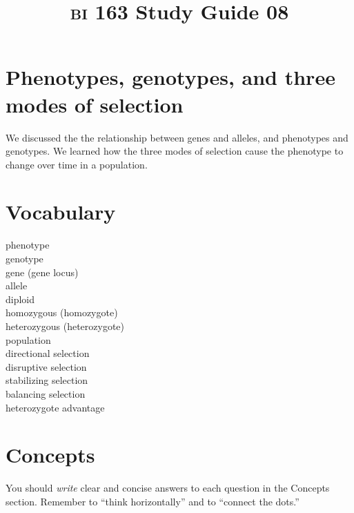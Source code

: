 \documentclass[letterpaper]{tufte-handout}
\title{{\scshape bi} 163 Study Guide 08}
\date{} %
\begin{document}
\maketitle	%

\section*{Phenotypes, genotypes, and three modes of selection}

We discussed the the relationship between genes and alleles, and phenotypes and genotypes. We learned how the three modes of selection cause the phenotype to change over time in a population.

\section*{Vocabulary}

\vspace{-1\baselineskip}
\begin{multicols}{2}
phenotype \\
genotype \\
gene (gene locus)\\
allele\\
diploid\\
homozygous (homozygote)\\
heterozygous (heterozygote)\\
population\\
directional selection\\
disruptive selection\\
stabilizing selection\\
balancing selection\\
heterozygote advantage

\end{multicols}

\section*{Concepts}

You should \emph{write} clear and concise answers to each question in the Concepts section.  Remember to ``think horizontally'' and to ``connect the dots.'' 
\end{document}
